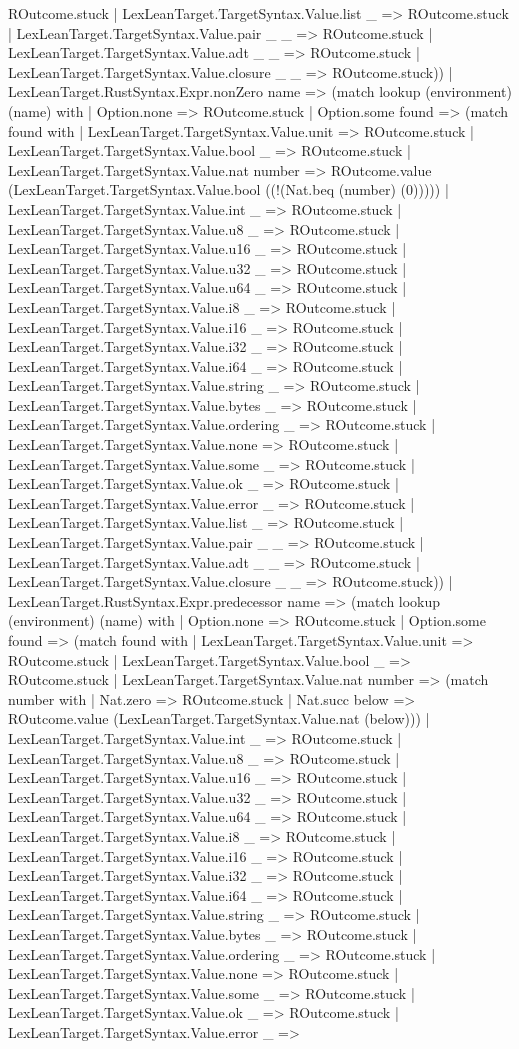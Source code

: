 \documentclass[11pt]{article}
\begin{document}
ROutcome.stuck | LexLeanTarget.TargetSyntax.Value.list \_ => ROutcome.stuck | LexLeanTarget.TargetSyntax.Value.pair \_ \_ => ROutcome.stuck | LexLeanTarget.TargetSyntax.Value.adt \_ \_ => ROutcome.stuck | LexLeanTarget.TargetSyntax.Value.closure \_ \_ => ROutcome.stuck)) | LexLeanTarget.RustSyntax.Expr.nonZero name => (match lookup (environment) (name) with | Option.none => ROutcome.stuck | Option.some found => (match found with | LexLeanTarget.TargetSyntax.Value.unit => ROutcome.stuck | LexLeanTarget.TargetSyntax.Value.bool \_ => ROutcome.stuck | LexLeanTarget.TargetSyntax.Value.nat number => ROutcome.value (LexLeanTarget.TargetSyntax.Value.bool ((!(Nat.beq (number) (0))))) | LexLeanTarget.TargetSyntax.Value.int \_ => ROutcome.stuck | LexLeanTarget.TargetSyntax.Value.u8 \_ => ROutcome.stuck | LexLeanTarget.TargetSyntax.Value.u16 \_ => ROutcome.stuck | LexLeanTarget.TargetSyntax.Value.u32 \_ => ROutcome.stuck | LexLeanTarget.TargetSyntax.Value.u64 \_ => ROutcome.stuck | LexLeanTarget.TargetSyntax.Value.i8 \_ => ROutcome.stuck | LexLeanTarget.TargetSyntax.Value.i16 \_ => ROutcome.stuck | LexLeanTarget.TargetSyntax.Value.i32 \_ => ROutcome.stuck | LexLeanTarget.TargetSyntax.Value.i64 \_ => ROutcome.stuck | LexLeanTarget.TargetSyntax.Value.string \_ => ROutcome.stuck | LexLeanTarget.TargetSyntax.Value.bytes \_ => ROutcome.stuck | LexLeanTarget.TargetSyntax.Value.ordering \_ => ROutcome.stuck | LexLeanTarget.TargetSyntax.Value.none => ROutcome.stuck | LexLeanTarget.TargetSyntax.Value.some \_ => ROutcome.stuck | LexLeanTarget.TargetSyntax.Value.ok \_ => ROutcome.stuck | LexLeanTarget.TargetSyntax.Value.error \_ => ROutcome.stuck | LexLeanTarget.TargetSyntax.Value.list \_ => ROutcome.stuck | LexLeanTarget.TargetSyntax.Value.pair \_ \_ => ROutcome.stuck | LexLeanTarget.TargetSyntax.Value.adt \_ \_ => ROutcome.stuck | LexLeanTarget.TargetSyntax.Value.closure \_ \_ => ROutcome.stuck)) | LexLeanTarget.RustSyntax.Expr.predecessor name => (match lookup (environment) (name) with | Option.none => ROutcome.stuck | Option.some found => (match found with | LexLeanTarget.TargetSyntax.Value.unit => ROutcome.stuck | LexLeanTarget.TargetSyntax.Value.bool \_ => ROutcome.stuck | LexLeanTarget.TargetSyntax.Value.nat number => (match number with | Nat.zero => ROutcome.stuck | Nat.succ below => ROutcome.value (LexLeanTarget.TargetSyntax.Value.nat (below))) | LexLeanTarget.TargetSyntax.Value.int \_ => ROutcome.stuck | LexLeanTarget.TargetSyntax.Value.u8 \_ => ROutcome.stuck | LexLeanTarget.TargetSyntax.Value.u16 \_ => ROutcome.stuck | LexLeanTarget.TargetSyntax.Value.u32 \_ => ROutcome.stuck | LexLeanTarget.TargetSyntax.Value.u64 \_ => ROutcome.stuck | LexLeanTarget.TargetSyntax.Value.i8 \_ => ROutcome.stuck | LexLeanTarget.TargetSyntax.Value.i16 \_ => ROutcome.stuck | LexLeanTarget.TargetSyntax.Value.i32 \_ => ROutcome.stuck | LexLeanTarget.TargetSyntax.Value.i64 \_ => ROutcome.stuck | LexLeanTarget.TargetSyntax.Value.string \_ => ROutcome.stuck | LexLeanTarget.TargetSyntax.Value.bytes \_ => ROutcome.stuck | LexLeanTarget.TargetSyntax.Value.ordering \_ => ROutcome.stuck | LexLeanTarget.TargetSyntax.Value.none => ROutcome.stuck | LexLeanTarget.TargetSyntax.Value.some \_ => ROutcome.stuck | LexLeanTarget.TargetSyntax.Value.ok \_ => ROutcome.stuck | LexLeanTarget.TargetSyntax.Value.error \_ => 
\end{document}
